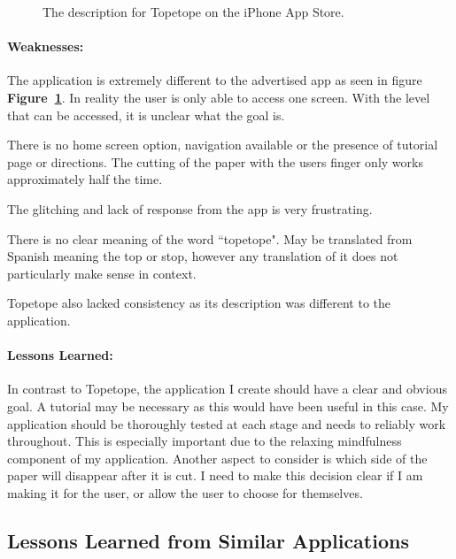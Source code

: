 \documentclass[11pt]{article}
\begin{document}
\begin{figure}[!ht]
\begin{minipage}{0.48\textwidth}
                            \captionsetup{margin = 0.5cm}
                            \caption{The description for Topetope on the iPhone App Store.}
                            \label{fig:topeAdvertising}
                        \end{minipage}
                    \end{figure}
                    

                \paragraph{Weaknesses:}
                The application is extremely different to the advertised app as seen in figure \textbf{Figure~\ref{fig:topeAdvertising}}. In reality the user is only able to access one screen. With the level that can be accessed, it is unclear what the goal is.
                
                There is no home screen option, navigation available or the presence of tutorial page or directions. The cutting of the paper with the users finger only works approximately half the time.
                
                The glitching and lack of response from the app is very frustrating.
                
                
                There is no clear meaning of the word ``topetope". May be translated from Spanish meaning the top or stop, however any translation of it does not particularly make sense in context. 
                
                 Topetope also lacked consistency as its description was different to the application.

                \paragraph{Lessons Learned:}
                In contrast to Topetope, the application I create should have a clear and obvious goal. A tutorial may be necessary as this would have been useful in this case. My application should be thoroughly tested at each stage and needs to reliably work throughout. This is especially important due to the relaxing mindfulness component of my application. Another aspect to consider is which side of the paper will disappear after it is cut. I need to make this decision clear if I am making it for the user, or allow the user to choose for themselves. 


       \subsection{Lessons Learned from Similar Applications}
       
\end{document}
